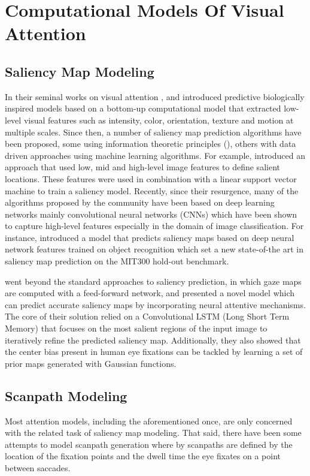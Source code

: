 \documentclass{article} %
\begin{document}
\section{Computational Models Of Visual Attention}
\subsection{Saliency Map Modeling}
In their  seminal works on visual attention \cite{koch_ullman_1987},
\cite{tsotsos_culhane_wai_lai_davis_nuflo_1995} and \cite{itti_koch_niebur_1998} introduced predictive biologically inspired models based on a bottom-up computational model that extracted low-level visual features such as intensity, color, orientation, texture and motion at multiple scales. Since then,  a number of saliency map prediction algorithms have been proposed, some using information theoretic principles (\cite{bruce_tsotsos_2007}), others with data driven approaches using machine learning algorithms. For example, \cite{Judd_2009} introduced an approach that used low, mid and high-level image features to define salient
locations. These features were used in combination with a linear support vector machine to train a saliency model. Recently, since their resurgence, many of the algorithms proposed by the community have been based on deep learning networks mainly convolutional neural networks (CNNs) which  have been shown to capture high-level features especially in the domain of image classification. For instance, \cite{Kummerer_2017_ICCV} introduced a model that predicts saliency maps based on deep neural network features trained on object recognition which set a new state-of-the art in saliency map prediction on the MIT300 hold-out benchmark. 

\cite{DBLP:journals/corr/CorniaBSC16a} went beyond the standard approaches to saliency prediction, in which gaze maps are computed with a feed-forward network, and presented a novel model which can predict accurate saliency maps by incorporating neural attentive mechanisms. The core of their solution relied on  a Convolutional LSTM (Long Short Term Memory) that focuses on the most salient regions of the input image to iteratively refine the predicted saliency map. Additionally, they also showed that the center bias present in human eye fixations can be tackled by learning  a set of prior maps generated with Gaussian functions.

\subsection{Scanpath Modeling}
Most attention models, including the aforementioned once, are only concerned with the related task of saliency map modeling. That said, there have been some attempts to model scanpath generation where by scanpaths are defined by the location of the fixation points and the dwell time the eye fixates on a point between saccades.
\end{document}
